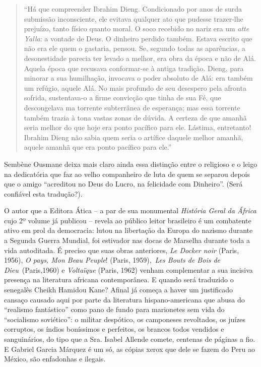 \documentclass[
  letterpaper,
  DIV=11,
  numbers=noendperiod]{scrreprt}
\begin{document}
\begin{quote}
``Há que compreender Ibrahim Dieng. Condicionado por anos de surda
submissão inconsciente, ele evitava qualquer ato que pudesse trazer-lhe
prejuízo, tanto físico quanto moral. O soco recebido no nariz era um
\emph{atte Yalla}: a vontade de Deus. O dinheiro perdido também. Estava
escrito que não era ele quem o gastaria, pensou. Se, segundo todas as
aparências, a desonestidade parecia ter levado a melhor, era obra da
época e não de Alá. Aquela época que recusava conformar-se à antiga
tradição. Dieng, para minorar a sua humilhação, invocava o poder
absoluto de Alá: era também um refúgio, aquele Alá. No mais profundo de
seu desespero pela afronta sofrida, sustentava-o a firme convicção que
tinha de sua Fé, que descongelava ma torrente subterrânea de esperança;
mas essa torrente também trazia à tona vastas zonas de dúvida. A certeza
de que amanhã seria melhor do que hoje era ponto pacífico para ele.
Lástima, entretanto! Ibrahim Dieng não sabia quem seria o artífice
daquele melhor amanhã, aquele amanhã que era ponto pacífico para ele.''
\end{quote}

Sembène Ousmane deixa mais claro ainda essa distinção entre o religioso
e o leigo na dedicatória que faz ao velho companheiro de luta de quem se
separou depois que o amigo ``acreditou no Deus do Lucro, na felicidade
com Dinheiro''. (Será confiável esta tradução?).

O autor que a Editora Ática -- a par de sua monumental \emph{História
Geral da África} cujo 2º volume já publicou -- revela ao público leitor
brasileiro é um combatente ativo em prol da democracia: lutou na
libertação da Europa do nazismo durante a Segunda Guerra Mundial, foi
estivador nas docas de Marselha durante toda a vida autoditada. É
preciso que suas obras anteriores, \emph{Le Docker noir} (Paris, 1956),
\emph{O pays, Mon Beau Peuple}! (Paris, 1959),~\emph{Les Bouts de Bois
de Dieu}~(Paris,1960) e \emph{Voltaïque} (Paris, 1962) venham
complementar a sua incisiva presença na literatura africana
contemporânea. E quando será traduzido o senegalês Cheikh Hamidou Kane?
Afinal já começa a haver um justificado cansaço causado aqui por parte
da literatura hispano-americana que abusa do ``realismo fantástico''
como pano de fundo para marionetes sem vida do ``socialismo soviético'':
o militar despótico, os camponeses revoltados, os juízes corruptos, os
índios boníssimos e perfeitos, os brancos todos vendidos e sanguinários,
do tipo que a Sra. Isabel Allende comete, centenas de páginas a fio. E
Gabriel Garcia Márquez é um só, as cópias xerox que dele se fazem do
Peru ao México, são enfadonhas e ilegais.
\end{document}
